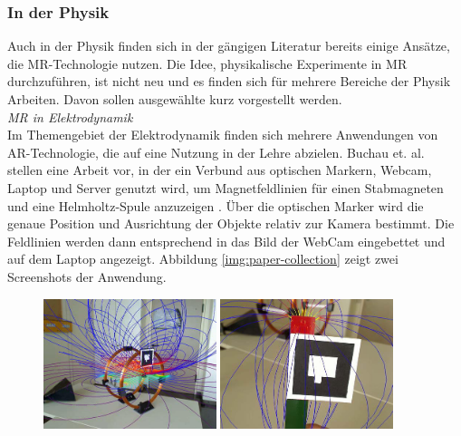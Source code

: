 \subsubsection{In der Physik}
Auch in der Physik finden sich in der gängigen Literatur bereits einige Ansätze, die MR-Technologie nutzen. Die Idee, physikalische Experimente in MR durchzuführen, ist nicht neu und es finden sich für mehrere Bereiche der Physik Arbeiten. Davon sollen ausgewählte kurz vorgestellt werden.\\

\vspace{4px}
\textit{MR in Elektrodynamik}\\
Im Themengebiet der Elektrodynamik finden sich mehrere Anwendungen von AR-Technologie, die auf eine Nutzung in der Lehre abzielen. Buchau et. al. stellen eine Arbeit vor, in der ein Verbund aus optischen Markern, Webcam, Laptop und Server genutzt wird, um Magnetfeldlinien für einen Stabmagneten und eine Helmholtz-Spule anzuzeigen \cite{Buchau09}. Über die optischen Marker wird die genaue Position und Ausrichtung der Objekte relativ zur Kamera bestimmt. Die Feldlinien werden dann entsprechend in das Bild der WebCam eingebettet und auf dem Laptop angezeigt. Abbildung \ref{img:paper-collection} zeigt zwei Screenshots der Anwendung.\\

\begin{figure}[h!]
	\centering
	\includegraphics[width=0.45\textwidth]{images/Buchau09.jpg}
	\hspace{0.05cm}
	\includegraphics[width=0.45\textwidth]{images/Buchau09_Magnet_2.jpg}
	\caption{\cite{Matsutomo13}}
\end{figure}

